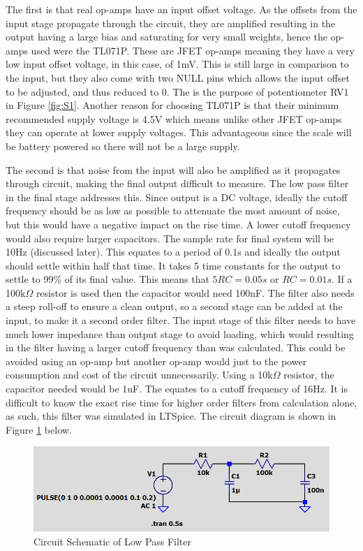 \documentclass[class=report,11pt,crop=false]{standalone}
\begin{document}
	The first is that real op-amps have an input offset voltage. As the offsets from the input stage propagate through the circuit, they are amplified resulting in the output having a large bias and saturating for very small weights, hence the op-amps used were the TL071P. These are JFET op-amps meaning they have a very low input offset voltage, in this case, of 1mV. This is still large in comparison to the input, but they also come with two NULL pins which allows the input offset to be adjusted, and thus reduced to 0. The is the purpose of potentiometer RV1 in Figure \ref{fig:S1}. Another reason for choosing TL071P is that their minimum recommended supply voltage is 4.5V which means unlike other JFET op-amps they can operate at lower supply voltages. This advantageous since the scale will be battery powered so there will not be a large supply.
	
	The second is that noise from the input will also be amplified as it propagates through circuit, making the final output difficult to measure. The low pass filter in the final stage addresses this. Since output is a DC voltage, ideally the cutoff frequency should be as low as possible to attenuate the most amount of noise, but this would have a negative impact on the rise time. A lower cutoff frequency would also require larger capacitors. The sample rate for final system will be 10Hz (discussed later). This equates to a period of 0.1s and ideally the output should settle within half that time. It takes 5 time constants for the output to settle to 99\% of its final value. This means that $5RC = 0.05s$ or $RC = 0.01s$. If a 100k$\Omega$ resistor is used then the capacitor would need 100nF. The filter also needs a steep roll-off to ensure a clean output, so a second stage can be added at the input, to make it a second order filter. The input stage of this filter needs to have much lower impedance than output stage to avoid loading, which would resulting in the filter having a larger cutoff frequency than was calculated. This could be avoided using an op-amp but another op-amp would just to the power consumption and cost of the circuit unnecessarily. Using a 10k$\Omega$ resistor, the capacitor needed would be 1uF. The equates to a cutoff frequency of 16Hz. It is difficult to know the exact rise time for higher order filters from calculation alone, as such, this filter was simulated in LTSpice. The circuit diagram is shown in Figure \ref{fig:S2} below.
	
	\begin{figure}[h!]
		\centering
		\includegraphics[width=0.5\linewidth]{Figures/Filter.png}
		\caption{Circuit Schematic of Low Pass Filter}
		\label{fig:S2}
	\end{figure}
	
\end{document}
